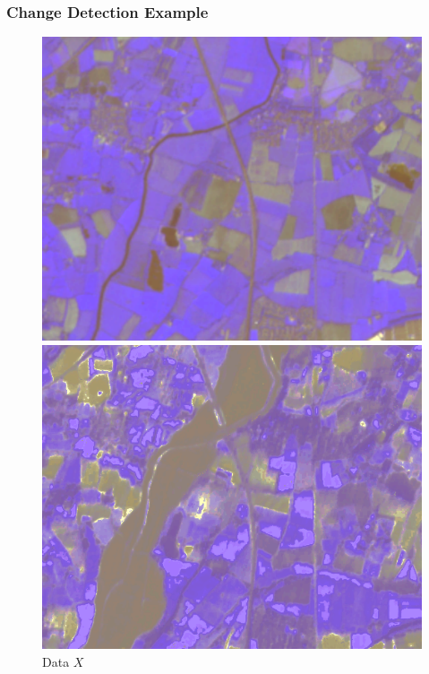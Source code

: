 \documentclass{beamer}
\begin{document}

\begin{frame}
  \frametitle{Change Detection Example}
  \setlength{\abovecaptionskip}{0pt plus 0pt minus 2pt} %
  \begin{figure}[ht]
    \centering
    \begin{minipage}[b]{0.28\linewidth}
      \centering
      \includegraphics[width=\textwidth]{./Images/ChangeDetect/Flood/pictureX.png}
      \caption{Data $X$}
    \end{minipage}
    \hfill
    \begin{minipage}[b]{0.28\linewidth}
      \centering
      \includegraphics[width=\textwidth]{./Images/ChangeDetect/Flood/permX.png}

\end{minipage}
\end{figure}
\end{frame}
\end{document}
